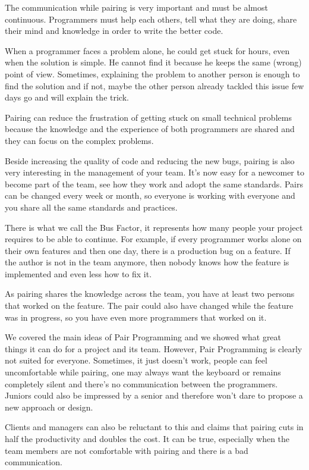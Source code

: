 The communication while pairing is very important and must be almost
continuous.
Programmers must help each others, tell what they are doing, share their
mind and knowledge in order to write the better code.

When a programmer faces a problem alone, he could get stuck for hours,
even when the solution is simple.
He cannot find it because he keeps the same (wrong) point of view.
Sometimes, explaining the problem to another person is enough to find
the solution and if not, maybe the other person already tackled this
issue few days go and will explain the trick.

Pairing can reduce the frustration of getting stuck on small technical
problems because the knowledge and the experience of both programmers
are shared and they can focus on the complex problems.

Beside increasing the quality of code and reducing the new bugs, pairing
is also very interesting in the management of your team.
It's now easy for a newcomer to become part of the team, see how they
work and adopt the same standards.
Pairs can be changed every week or month, so everyone is working with
everyone and you share all the same standards and practices.

There is what we call the Bus Factor, it represents how many people your
project requires to be able to continue.
For example, if every programmer works alone on their own features and
then one day, there is a production bug on a feature.
If the author is not in the team anymore, then nobody knows how the
feature is implemented and even less how to fix it.

As pairing shares the knowledge across the team, you have at least two
persons that worked on the feature.
The pair could also have changed while the feature was in progress, so you
have even more programmers that worked on it.

We covered the main ideas of Pair Programming and we showed what great
things it can do for a project and its team.
However, Pair Programming is clearly not suited for everyone.
Sometimes, it just doesn't work, people can feel uncomfortable while
pairing, one may always want the keyboard or remains completely
silent and there's no communication between the programmers.
Juniors could also be impressed by a senior and therefore won't dare to
propose a new approach or design.

Clients and managers can also be reluctant to this and claims that
pairing cuts in half the productivity and doubles the cost.
It can be true, especially when the team members are not comfortable with
pairing and there is a bad communication.


